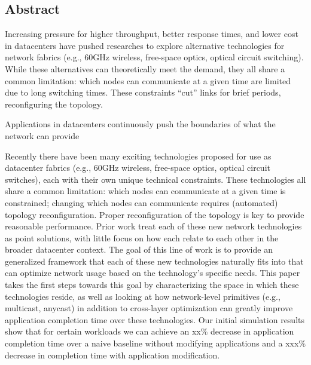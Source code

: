 \subsection*{Abstract}
Increasing pressure for higher throughput, better response times, and lower cost
in datacenters have pushed researches to explore alternative technologies for
network fabrics (e.g., 60GHz wireless, free-space optics, optical circuit
switching). While these alternatives can theoretically meet the demand, they all
share a common limitation: which nodes can communicate at a given time are
limited due to long switching times. These constraints ``cut'' links for brief
periods, reconfiguring the topology. 

Applications in datacenters continuously push the boundaries of what the network
can provide



Recently there have been many exciting technologies proposed for use as
datacenter fabrics (e.g., 60GHz wireless, free-space optics, optical circuit
switches), each with their own unique technical constraints. These technologies
all share a common limitation: which nodes can communicate at a given time is
constrained; changing which nodes can communicate requires (automated) topology
reconfiguration. Proper reconfiguration of the topology is key to provide
reasonable performance. Prior work treat each of these new network technologies
as point solutions, with little focus on how each relate to each other in the
broader datacenter context. The goal of this line of work is to provide an
generalized framework that each of these new technologies naturally fits into
that can optimize network usage based on the technology's specific needs. This
paper takes the first steps towards this goal by characterizing the space in
which these technologies reside, as well as looking at how network-level
primitives (e.g., multicast, anycast) in addition to cross-layer optimization
can greatly improve application completion time over these technologies. Our
initial simulation results show that for certain workloads we can achieve an
xx\% decrease in application completion time over a naive baseline without
modifying applications and a xxx\% decrease in completion time with application
modification.



